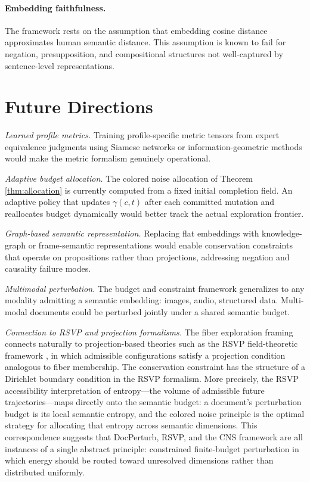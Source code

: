 \documentclass[12pt, a4paper]{article}
\theoremstyle{plain}
\theoremstyle{definition}
\theoremstyle{remark}
\begin{document}
\paragraph{Embedding faithfulness.}
The framework rests on the assumption that embedding cosine distance approximates
human semantic distance.  This assumption is known to fail for negation,
presupposition, and compositional structures not well-captured by
sentence-level representations.


\section{Future Directions}
\label{sec:future}

\emph{Learned profile metrics.}  Training profile-specific metric tensors from
expert equivalence judgments using Siamese networks or information-geometric
methods \cite{amari2016information} would make the metric formalism genuinely
operational.

\emph{Adaptive budget allocation.}  The colored noise allocation of Theorem
\ref{thm:allocation} is currently computed from a fixed initial completion
field.  An adaptive policy that updates $\gamma(c, t)$ after each committed
mutation and reallocates budget dynamically would better track the actual
exploration frontier.

\emph{Graph-based semantic representation.}  Replacing flat embeddings with
knowledge-graph or frame-semantic representations would enable conservation
constraints that operate on propositions rather than projections, addressing
negation and causality failure modes.

\emph{Multimodal perturbation.}  The budget and constraint framework
generalizes to any modality admitting a semantic embedding: images, audio,
structured data.  Multi-modal documents could be perturbed jointly under a
shared semantic budget.

\emph{Connection to RSVP and projection formalisms.}  The fiber exploration
framing connects naturally to projection-based theories such as the RSVP
field-theoretic framework \cite{flyxion2025rsvp}, in which admissible
configurations satisfy a projection condition analogous to fiber membership.
The conservation constraint has the structure of a Dirichlet boundary condition
in the RSVP formalism.  More precisely, the RSVP accessibility interpretation
of entropy---the volume of admissible future trajectories---maps directly onto
the semantic budget: a document's perturbation budget is its local semantic
entropy, and the colored noise principle is the optimal strategy for allocating
that entropy across semantic dimensions.  This correspondence suggests that
DocPerturb, RSVP, and the CNS framework are all instances of a single abstract
principle: constrained finite-budget perturbation in which energy should be
routed toward unresolved dimensions rather than distributed uniformly.
\end{document}
